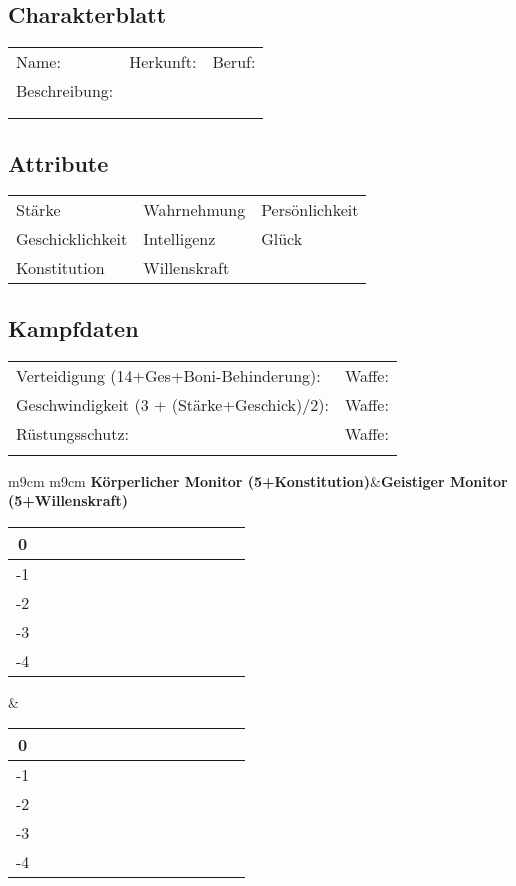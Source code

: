 \documentclass{article}
\begin{document}
\newpage
\begin{center}
\section{Charakterblatt}
\end{center}
\begin{tabular}{m{6cm} m{6cm} m{6cm}}
Name:&Herkunft:&Beruf:\\
Beschreibung:&&\\
&&\\
&&\\
\end{tabular}
\hline
\begin{center}
\subsection{Attribute}
\end{center}
\begin{tabular}{m{6cm} m{6cm} m{6cm}}
Stärke&Wahrnehmung&Persönlichkeit\\
Geschicklichkeit&Intelligenz&Glück\\
Konstitution&Willenskraft&\\
\end{tabular}
\newline\hline
\begin{center}
\subsection{Kampfdaten}
\end{center}
\begin{tabular}{m{10cm} m{10cm}}
Verteidigung (14+Ges+Boni-Behinderung):&Waffe:\\
Geschwindigkeit (3 + (Stärke+Geschick)/2):&Waffe:\\
Rüstungsschutz:&Waffe:\\
&\\
\end{tabular}
\begin{tabular}{ m{9cm} m{9cm} }
\textbf{Körperlicher Monitor (5+Konstitution)}&\textbf{Geistiger Monitor (5+Willenskraft)}\\
\begin{tabular}{| c | c | c | c | c | c | c | c | c | c | c | c | c | c |}
\hline
0&&&&&&&&&&&&&\\
\hline
-1&&&&&&&&&&&&&\\
\hline
-2&&&&&&&&&&&&&\\
\hline
-3&&&&&&&&&&&&&\\
\hline
-4&&&&&&&&&&&&&\\
\hline
\end{tabular}
&\begin{tabular}{| c | c | c | c | c | c | c | c | c | c | c | c | c | c |}
\hline
0&&&&&&&&&&&&&\\
\hline
-1&&&&&&&&&&&&&\\
\hline
-2&&&&&&&&&&&&&\\
\hline
-3&&&&&&&&&&&&&\\
\hline
-4&&&&&&&&&&&&&\\
\hline
\end{tabular}
\\
\end{tabular}
\end{document}
